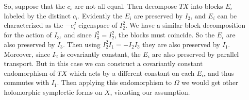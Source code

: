 \documentclass[12pt,letterpaper,reqno]{article}
\numberwithin{equation}{section}
\begin{document}
\begin{pf}
So, suppose that the $c_i$ are not all equal.
Then decompose $TX$ into blocks $E_i$ labeled by
the distinct $c_i$. Evidently the $E_i$ are preserved
by $I_2$, and $E_i$ can be characterized as the $-c_i^2$
eigenspace of $I_2^2$. 
We have a similar block decomposition for the
action of $I_3$, and since $I_3^2 = I_2^2$, the blocks 
must coincide. So the $E_i$ are also preserved by $I_3$.
Then using $I_2^2 I_1 = -I_2 I_3$ they are also 
preserved by $I_1$.
Moreover, since $I_2$ is covariantly constant,
the $E_i$ are also preserved by parallel transport.
But in this case we can construct a covariantly constant endomorphism
of $TX$ which acts by a different constant on each $E_i$, and
thus commutes with $I_1$.
Then applying this endomorphism to $\Omega$
we would get other holomorphic symplectic forms on $X$,
violating our assumption.
\end{pf}
\end{document}
